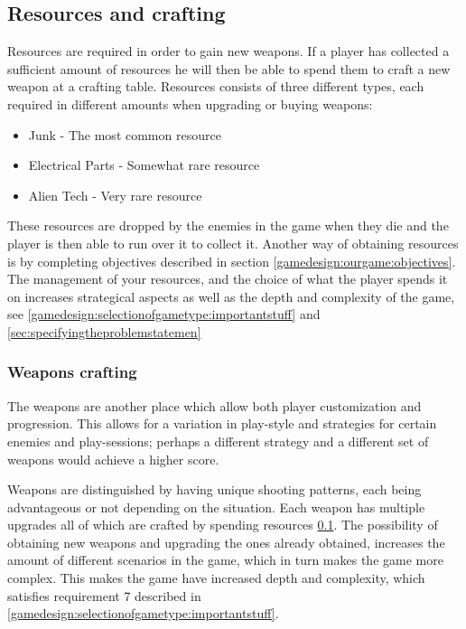 \subsection{Resources and crafting}\label{gamedesign:ourgame:crafting}
Resources are required in order to gain new weapons.
If a player has collected a sufficient amount of resources he will then be able to spend them to craft a new weapon at a crafting table.
Resources consists of three different types, each required in different amounts when upgrading or buying weapons:
\begin{itemize}
\item Junk - The most common resource
\item Electrical Parts - Somewhat rare resource
\item Alien Tech - Very rare resource
\end{itemize}
These resources are dropped by the enemies in the game when they die and the player is then able to run over it to collect it. Another way of obtaining resources is by completing objectives described in section \ref{gamedesign:ourgame:objectives}. 
The management of your resources, and the choice of what the player spends it on increases strategical aspects as well as the depth and complexity of the game, see \ref{gamedesign:selectionofgametype:importantstuff} and \ref{sec:specifyingtheproblemstatemen}

\subsubsection*{Weapons crafting}\label{gamedesign:ourgame:weapons}
The weapons are another place which allow both player customization and progression. This allows for a variation in play-style and strategies for certain enemies and play-sessions; perhaps a different strategy and a different set of weapons would achieve a higher score.

Weapons are distinguished by having unique shooting patterns, each being advantageous or not depending on the situation.
Each weapon has multiple upgrades all of which are crafted by spending resources \ref{gamedesign:ourgame:crafting}. The possibility of obtaining new weapons and upgrading the ones already obtained, increases the amount of different scenarios in the game, which in turn makes the game more complex. This makes the game have increased depth and complexity, which satisfies requirement 7 described in \ref{gamedesign:selectionofgametype:importantstuff}.

